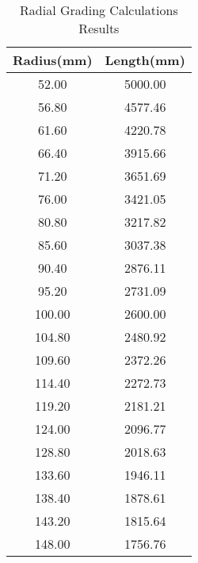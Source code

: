 \begin{table}[!htb]
\caption{Radial Grading Calculations Results}
\label{table:radialvals}
\begin{center}
\begin{tabular}{cc}
\toprule
\textbf{Radius(mm)} & \textbf{Length(mm)} \\ \toprule
52.00 & 5000.00 \\ 
56.80 & 4577.46 \\ 
61.60 & 4220.78 \\ 
66.40 & 3915.66 \\ 
71.20 & 3651.69 \\ 
76.00 & 3421.05 \\ 
80.80 & 3217.82 \\ 
85.60 & 3037.38 \\ 
90.40 & 2876.11 \\ 
95.20 & 2731.09 \\ 
100.00 & 2600.00 \\ 
104.80 & 2480.92 \\ 
109.60 & 2372.26 \\ 
114.40 & 2272.73 \\ 
119.20 & 2181.21 \\ 
124.00 & 2096.77 \\ 
128.80 & 2018.63 \\ 
133.60 & 1946.11 \\ 
138.40 & 1878.61 \\ 
143.20 & 1815.64 \\ 
148.00 & 1756.76 \\ 
\bottomrule
\end{tabular}
\end{center}
\end{table}
